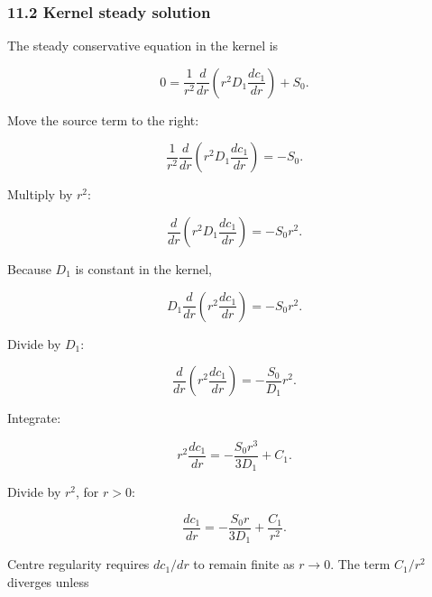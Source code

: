 \documentclass[11pt,a4paper]{article}
\begin{document}
\subsubsection*{11.2 Kernel steady solution}

The steady conservative equation in the kernel is

\begin{equation}
0=
\frac1{r^2}
\frac{d}{dr}
\left(
r^2D_1\frac{dc_1}{dr}
\right)
+S_0.
\tag{TRISO-ML-312}
\label{eq:triso-ml-312}
\end{equation}

Move the source term to the right:

\begin{equation}
\frac1{r^2}
\frac{d}{dr}
\left(
r^2D_1\frac{dc_1}{dr}
\right)
=-S_0.
\tag{TRISO-ML-313}
\label{eq:triso-ml-313}
\end{equation}

Multiply by $r^2$:

\begin{equation}
\frac{d}{dr}
\left(
r^2D_1\frac{dc_1}{dr}
\right)
=-S_0r^2.
\tag{TRISO-ML-314}
\label{eq:triso-ml-314}
\end{equation}

Because $D_1$ is constant in the kernel,

\begin{equation}
D_1
\frac{d}{dr}
\left(
r^2\frac{dc_1}{dr}
\right)
=-S_0r^2.
\tag{TRISO-ML-315}
\label{eq:triso-ml-315}
\end{equation}

Divide by $D_1$:

\begin{equation}
\frac{d}{dr}
\left(
r^2\frac{dc_1}{dr}
\right)
=-\frac{S_0}{D_1}r^2.
\tag{TRISO-ML-316}
\label{eq:triso-ml-316}
\end{equation}

Integrate:

\begin{equation}
r^2\frac{dc_1}{dr}
=
-\frac{S_0r^3}{3D_1}
+C_1.
\tag{TRISO-ML-317}
\label{eq:triso-ml-317}
\end{equation}

Divide by $r^2$, for $r>0$:

\begin{equation}
\frac{dc_1}{dr}
=
-\frac{S_0r}{3D_1}
+\frac{C_1}{r^2}.
\tag{TRISO-ML-318}
\label{eq:triso-ml-318}
\end{equation}

Centre regularity requires $dc_1/dr$ to remain finite as $r\to0$. The term $C_1/r^2$ diverges unless
\end{document}
